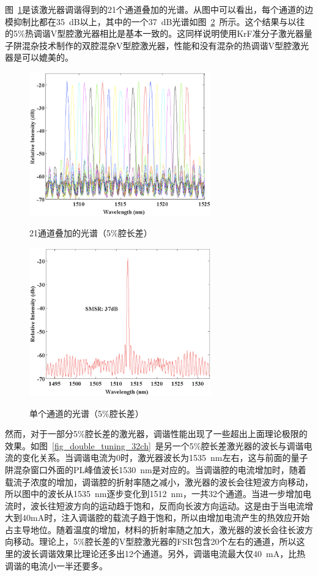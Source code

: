 \documentclass{ZJUthesis}
\begin{document}
图~\ref{fig_double_spectra_p5}是该激光器调谐得到的21个通道叠加的光谱。从图中可以看出，每个通道的边模抑制比都在35~dB以上，其中的一个37~dB光谱如图~\ref{fig_double_spectrum_p5}~所示。这个结果与以往的5\%热调谐V型腔激光器相比是基本一致的。这同样说明使用KrF准分子激光器量子阱混杂技术制作的双腔混杂V型腔激光器，性能和没有混杂的热调谐V型腔激光器是可以媲美的。

\begin{figure}[htbp]
  \centering
  \includegraphics[width=0.7\textwidth]{./Pictures/double_spectra_p5.eps}\\
  \caption{21通道叠加的光谱（5\%腔长差）}
  \label{fig_double_spectra_p5}
\end{figure}

\begin{figure}[htbp]
  \centering
  \includegraphics[width=0.7\textwidth]{./Pictures/double_spectrum_p5.eps}\\
  \caption{单个通道的光谱（5\%腔长差）}
  \label{fig_double_spectrum_p5}
\end{figure}

然而，对于一部分5\%腔长差的激光器，调谐性能出现了一些超出上面理论极限的效果。如图~\ref{fig_double_tuning_32ch}~是另一个5\%腔长差激光器的波长与调谐电流的变化关系。当调谐电流为0时，激光器波长为1535~nm左右，这与前面的量子阱混杂窗口外面的PL峰值波长1530~nm是对应的。当调谐腔的电流增加时，随着载流子浓度的增加，调谐腔的折射率随之减小，激光器的波长会往短波方向移动，所以图中的波长从1535~nm逐步变化到1512~nm，一共32个通道。当进一步增加电流时，波长往短波方向的运动趋于饱和，反而向长波方向运动。这是由于当电流增大到40mA时，注入调谐腔的载流子趋于饱和，所以由增加电流产生的热效应开始占主导地位。随着温度的增加，材料的折射率随之加大，激光器的波长会往长波方向移动。理论上，5\%腔长差的V型腔激光器的FSR包含20个左右的通道，所以这里的波长调谐效果比理论还多出12个通道。另外，调谐电流最大仅40~mA，比热调谐的电流小一半还要多。
\end{document}
